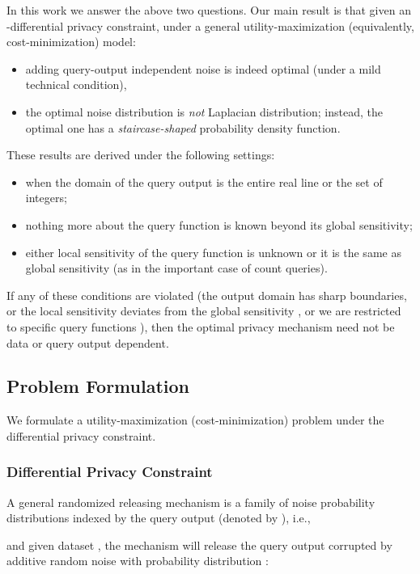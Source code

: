 In this work we answer the above two questions. Our main result is that given an -differential privacy constraint, under a general utility-maximization (equivalently, cost-minimization) model:
\begin{itemize}
	\item adding query-output independent noise is indeed optimal (under a mild technical condition),
	\item the optimal noise distribution is {\em not} Laplacian distribution; instead, the optimal one has a {\em staircase-shaped} probability density function.
\end{itemize}

These results are derived under the following settings:
\begin{itemize}
\item when the domain of the query output is the entire real line or the set of integers;
\item nothing more about the query function is known beyond its global sensitivity;
\item either local sensitivity \cite{NRS07} of the query function is unknown or it is the same as global sensitivity (as in the important case of count queries).
\end{itemize}
If any of these conditions are violated (the output domain has sharp boundaries, or the local sensitivity deviates from the global sensitivity \cite{NRS07}, or we are restricted to specific query functions \cite{CM08}), then the optimal privacy mechanism need not be data or query output dependent.







\subsection{Problem Formulation}

We formulate a utility-maximization (cost-minimization) problem under the differential privacy constraint.

\subsubsection{Differential Privacy Constraint}
A general randomized releasing mechanism  is a family of noise probability distributions indexed by  the query output (denoted by ), i.e.,

and given dataset , the mechanism  will release the query output  corrupted by additive random noise with probability distribution :

